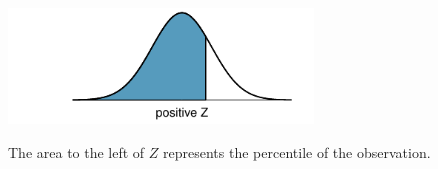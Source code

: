 \begin{table}[H]
\begin{center}{\small
\includegraphics[width=81mm]{extraTeX/appendix/figures/normalTails/normalTailRight} \vspace{2mm} \\

\begin{flushleft}
The area to the left of $Z$ represents the percentile of the observation.\\
\end{flushleft}

}
\end{center}
\end{table}
